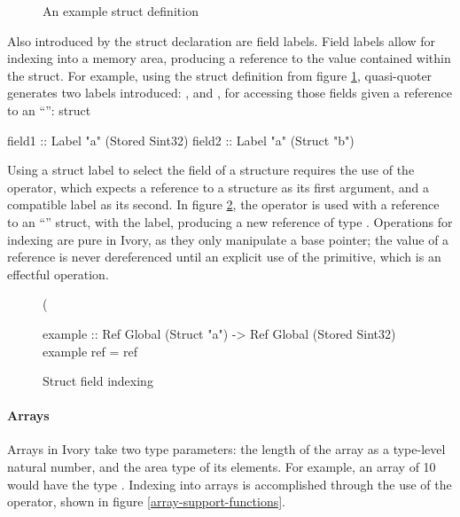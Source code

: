 \begin{figure}[h]
\begin{code}
\end{code}
\caption{An example struct definition}
\label{example-struct}
\end{figure}

Also introduced by the struct declaration are field labels.  Field labels allow
for indexing into a memory area, producing a reference to the value contained
within the struct.  For example, using the struct definition from figure
\ref{example-struct}, quasi-quoter generates two labels introduced: , and
, for accessing those fields given a reference to an ``'':
struct
\begin{code}
field1 :: Label "a" (Stored Sint32)
field2 :: Label "a" (Struct "b")
\end{code}

Using a struct label to select the field of a structure requires the use of the
\cd{(\mytilde>)} operator, which expects a reference to a structure as its first
argument, and a compatible label as its second.  In figure
\ref{example-struct-label}, the \cd{(\mytilde>)} operator is used with a
reference to an ``'' struct, with the  label, producing a new
reference of type .  Operations for indexing are
pure in Ivory, as they only manipulate a base pointer; the value of a reference
is never dereferenced until an explicit use of the  primitive, which
is an effectful operation.

\begin{figure}[h]
\begin{code}
(%

example :: Ref Global (Struct "a")
        -> Ref Global (Stored Sint32)
example ref = ref %
\end{code}
\caption{Struct field indexing}
\label{example-struct-label}
\end{figure}

\paragraph{Arrays}
Arrays in Ivory take two type parameters: the length of the array as a
type-level natural number, and the area type of its elements.  For example, an
array of 10  would have the type .  Indexing into arrays is accomplished through the use of the \cd{(!)}
operator, shown in figure \ref{array-support-functions}.

